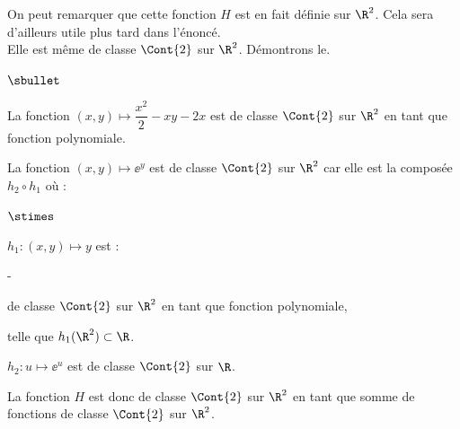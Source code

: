 \documentclass[11pt]{article}%
\begin{document}
\begin{remark}
  On peut remarquer que cette fonction $H$ est en fait définie sur 
  $\R^2$. Cela sera d'ailleurs utile plus tard dans l'énoncé. \\
  Elle est même de classe $\Cont{2}$ sur $\R^2$.
  Démontrons le.~\\[-.4cm]
  \begin{noliste}{$\sbullet$}
    \item La fonction $(x,y) \mapsto \dfrac{x^2}{2} -xy -2x$ est de 
    classe $\Cont{2}$ sur $\R^2$ en tant que fonction polynomiale.
    \item La fonction $(x,y) \mapsto \ee^y$ est de classe $\Cont{2}$
    sur $\R^2$ car elle est la composée $h_2 \circ h_1$ où :
    \begin{noliste}{$\stimes$}
      \item $h_1 : (x,y) \mapsto y$ est :
      \begin{noliste}{-}
	\item de classe $\Cont{2}$ sur $\R^2$ en tant que fonction 
	polynomiale,
	\item telle que $h_1(\R^2) \subset \R$.
      \end{noliste}
      \item $h_2: u \mapsto \ee^u$ est de classe $\Cont{2}$ sur $\R$.
    \end{noliste}
    \item La fonction $H$ est donc de classe $\Cont{2}$ sur $\R^2$
    en tant que somme de fonctions de classe $\Cont{2}$ sur $\R^2$.
  \end{noliste}
\end{remark}
\end{document}
